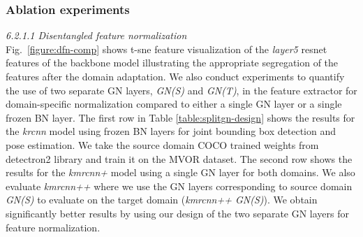\subsubsection{Ablation experiments}
\emph{6.2.1.1 Disentangled feature normalization}\\
{\blue Fig.~\ref{figure:dfn-comp} shows t-sne feature visualization \citep{van2008visualizing} of the \emph{layer5} resnet features of the backbone model illustrating the appropriate segregation of the features after the domain adaptation}. We also conduct experiments to quantify the use of two separate GN layers, \emph{GN(S)} and  \emph{GN(T)}, in the feature extractor for domain-specific normalization compared to either a single GN layer or a single frozen BN layer. The first row in Table \ref{table:splitgn-design} shows the results for the \emph{krcnn} \citep{he2017mask,wu2019detectron2kpn} model using frozen BN \citep{he2016deep} layers for joint bounding box detection and pose estimation. We take the source domain COCO trained weights from detectron2 \citep{wu2019detectron2} library and train it on the MVOR dataset. The second row shows the results for the \emph{kmrcnn+} model using a single GN layer for both domains. We also evaluate \emph{kmrcnn++} where we use the GN layers corresponding to source domain \emph{GN(S)} to evaluate on the target domain (\emph{kmrcnn++ GN(S)}). We obtain significantly better results by using our design of the two separate GN layers for feature normalization.\\
